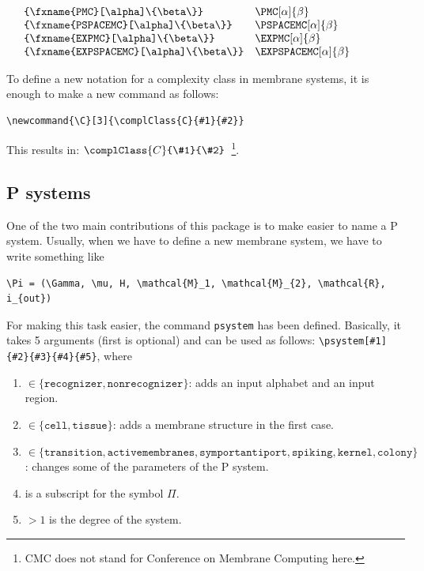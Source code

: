 \documentclass{article}
\begin{document}
$
\begin{array}{lll}
    \mbox{} & \verb=\PMC[\alpha]{\beta}= & \PMC[\alpha]{\beta} \\
    \mbox{} & \verb=\PSPACEMC[\alpha]{\beta}= & \PSPACEMC[\alpha]{\beta} \\
    \mbox{} & \verb=\EXPMC[\alpha]{\beta}= & \EXPMC[\alpha]{\beta} \\
    \mbox{} & \verb=\EXPSPACEMC[\alpha]{\beta}= & \EXPSPACEMC[\alpha]{\beta} \\
\end{array}
$

To define a new notation for a complexity class in membrane systems, it is
enough to make a new command as follows:

\begin{verbatim}
\newcommand{\C}[3]{\complClass{C}{#1}{#2}}
\end{verbatim}

This results in: $\complClass{C}{\#1}{\#2}$~\footnote{CMC does not
  stand for Conference on Membrane Computing here.}.

\subsection{P systems}
\label{sec:p-systems}

One of the two main contributions of this package is to make easier to
name a P system. Usually, when we have to define a new membrane
system, we have to write something like 

\begin{verbatim}
\Pi = (\Gamma, \mu, H, \mathcal{M}_1, \mathcal{M}_{2}, \mathcal{R}, i_{out})
\end{verbatim}

For making this task easier, the command \verb=psystem= has been
defined. Basically, it takes 5 arguments (first is optional) and can
be used as follows: \verb=\psystem[#1]{#2}{#3}{#4}{#5}=, where

\begin{enumerate}[label=\texttt{\#\arabic*}]
\item $\in \{\mathtt{recognizer}, \mathtt{nonrecognizer}\}$: adds an
  input alphabet and an input region.
\item $\in \{\mathtt{cell}, \mathtt{tissue}\}$: adds a membrane
  structure in the first case.
\item
  $\in \{\mathtt{transition}, \mathtt{activemembranes},
  \mathtt{symportantiport}, \mathtt{spiking}, \mathtt{kernel},
  \mathtt{colony}\}$: changes some of the parameters of the P system.
\item is a subscript for the symbol $\Pi$.
\item $> 1$ is the degree of the system.
\end{enumerate}
\end{document}
